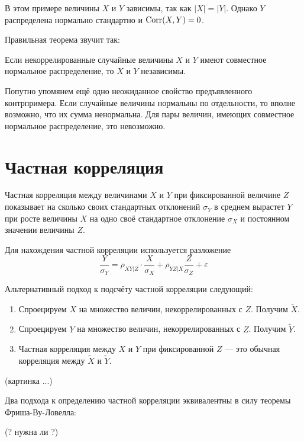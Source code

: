\documentclass[10pt]{article}
\begin{document}
В этом примере величины $X$ и $Y$ зависимы, так как $|X|=|Y|$. Однако $Y$ распределена нормально стандартно и $\operatorname{Corr}(X,Y)=0$.  

Правильная теорема звучит так:

\begin{theorem}
Если некоррелированные случайные величины $X$ и $Y$ имеют совместное нормальное распределение, то $X$ и $Y$ независимы.
\end{theorem}

Попутно упомянем ещё одно неожиданное свойство предъявленного контрпримера. Если случайные величины нормальны по отдельности, то вполне возможно, что их сумма ненормальна. Для пары величин, имеющих совместное нормальное распределение, это невозможно.


\section{Частная корреляция}

\begin{definition}
Частная корреляция между величинами $X$ и $Y$ при фиксированной величине $Z$ показывает на сколько своих стандартных отклонений $\sigma_Y$ в среднем вырастет $Y$ при росте величины $X$ на одно своё стандартное отклонение $\sigma_X$ и постоянном значении величины $Z$.
\end{definition}

Для нахождения частной корреляции используется разложение
\[
\frac{Y}{\sigma_Y}=\rho_{XY|Z} \cdot \frac{X}{\sigma_X} + \rho_{YZ|X} \frac{Z}{\sigma_Z} + \varepsilon
\]


Альтернативный подход к подсчёту частной корреляции следующий:
\begin{enumerate}
\item Спроецируем $X$ на множество величин, некоррелированных с $Z$. Получим $\tilde{X}$.
\item Спроецируем $Y$ на множество величин, некоррелированных с $Z$. Получим $\tilde{Y}$.
\item Частная корреляция между $X$ и $Y$ при фиксированной $Z$ --- это обычная корреляция между $\tilde{X}$ и $\tilde{Y}$.
\end{enumerate}


(картинка ...)


Два подхода к определению частной корреляции эквивалентны в силу теоремы Фриша-Ву-Ловелла:

(?   нужна ли ?)
\end{document}
